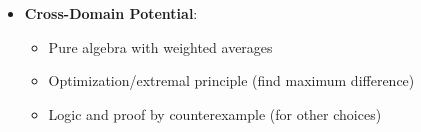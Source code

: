\documentclass[12pt]{article}
\begin{document}
\begin{problemconfigbox}
\begin{itemize}[leftmargin=*]
\begin{itemize}
        \item Calculate: $Y_2 - Z_1 = (Y_1 + 18) - (Y_1 - 3) = 21$
        \item So 22 is impossible!
    \end{itemize}
    \item \textbf{Cross-Domain Potential}: 
    \begin{itemize}
        \item Pure algebra with weighted averages
        \item Optimization/extremal principle (find maximum difference)
        \item Logic and proof by counterexample (for other choices)
    \end{itemize}
\end{itemize}
\end{problemconfigbox}
\end{document}
